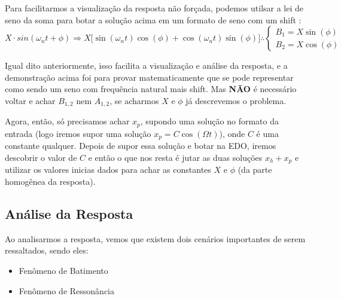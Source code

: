 \documentclass{article}
\begin{document}
                Para facilitarmos a visualização da resposta não forçada, podemos utilsar a lei de seno da soma para botar a solução acima em um formato de seno com um shift :
                $$X \cdot sin(\omega_n t + \phi)\Rightarrow X\big[\sin(\omega_n t)\cos(\phi) + \cos(\omega_n t)\sin(\phi)\big] \therefore \begin{cases}
                    B_1 = X\sin(\phi) \\ 
                    B_2 = X\cos(\phi)
                \end{cases}$$

                Igual dito anteriormente, isso facilita a visualização e análise da resposta, e a demonstração acima foi para provar matematicamente que se pode representar como sendo um seno com 
                frequência natural mais shift. Mas \textbf{NÃO} é necessário voltar e achar $B_{1,2}$ nem $A_{1,2}$, se acharmos $X$ e $\phi$ já descrevemos o problema.


                Agora, então, só precisamos achar $x_p$, supondo uma solução no formato da entrada (logo iremos supor uma solução $x_p = C \cos(\Omega t)$), onde $C$ é uma constante qualquer. Depois
                de supor essa solução e botar na EDO, iremos descobrir o valor de $C$ e então o que nos resta é jutar as duas soluções $x_h + x_p$ e utilizar os valores inicias dados para achar as
                constantes $X$ e $\phi$ (da parte homogênea da resposta).
            
            \subsection{Análise da Resposta}
                Ao analisarmos a resposta, vemos que existem dois cenários importantes de serem ressaltados, sendo eles:
                \begin{itemize}
                    \item Fenômeno de Batimento
                    \item Fenômeno de Ressonância
                \end{itemize}
\end{document}
